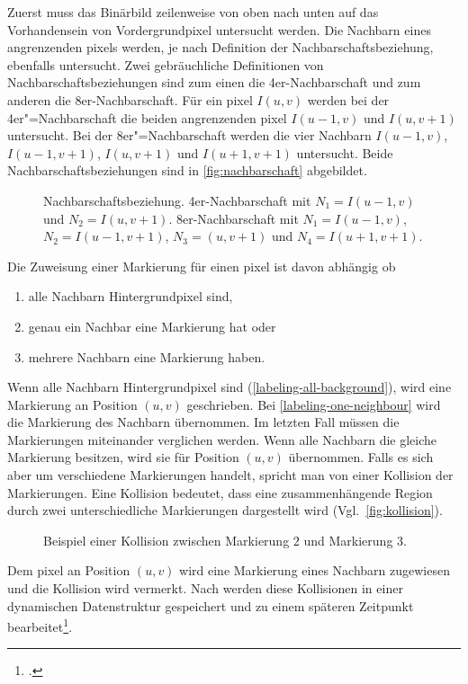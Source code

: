 Zuerst muss das Binärbild zeilenweise von oben nach unten auf das Vorhandensein von Vordergrundpixel untersucht werden.
Die Nachbarn eines angrenzenden \glspl{pixel} werden, je nach Definition der Nachbarschaftsbeziehung, ebenfalls
 untersucht. Zwei gebräuchliche Definitionen von Nachbarschaftsbeziehungen sind zum einen die 4er-Nachbarschaft und zum
 anderen die 8er-Nachbarschaft. Für ein \gls{pixel} $I(u,v)$ werden bei der 4er"=Nachbarschaft die beiden angrenzenden
 \gls{pixel} $I(u-1,v)$ und $I(u,v+1)$ untersucht. Bei der 8er"=Nachbarschaft werden die vier Nachbarn $I(u-1,v)$,
 $I(u-1,v+1)$, $I(u,v+1)$ und $I(u+1,v+1)$ untersucht. Beide Nachbarschaftsbeziehungen sind in
 \autoref{fig:nachbarschaft} abgebildet.
\begin{figure}[!ht]
	\centering
	\subfigure[]{
		\label{fig:4er-nachbarschaft}
		
	}
	\subfigure[]{
		\label{fig:8er-nachbarschaft}
		
	}
	\caption{Nachbarschaftsbeziehung.  4er-Nachbarschaft mit $N_1 = I(u-1,v)$ und
	 $N_2 = I(u,v+1)$.  8er-Nachbarschaft mit $N_1 = I(u-1,v)$, $N_2 = I(u-1,v+1)$,
	 $N_3 = (u,v+1)$ und $N_4 = I(u+1,v+1)$.}
	\label{fig:nachbarschaft}
\end{figure}
Die Zuweisung einer Markierung für einen \gls{pixel} ist davon abhängig ob
\begin{enumerate}
	\item alle Nachbarn Hintergrundpixel sind, \label{labeling-all-background}
	\item genau ein Nachbar eine Markierung hat oder \label{labeling-one-neighbour}
	\item mehrere Nachbarn eine Markierung haben. \label{labeling-many-neighbours}
\end{enumerate}

Wenn alle Nachbarn Hintergrundpixel sind (\autoref{labeling-all-background}), wird eine Markierung an Position $(u,v)$
 geschrieben. Bei \autoref{labeling-one-neighbour} wird die Markierung des Nachbarn übernommen. Im letzten Fall müssen
 die Markierungen miteinander verglichen werden. Wenn alle Nachbarn die gleiche Markierung besitzen, wird sie für
 Position $(u,v)$ übernommen. Falls es sich aber um verschiedene Markierungen handelt, spricht man von einer Kollision
 der Markierungen. Eine Kollision bedeutet, dass eine zusammenhängende Region durch zwei unterschiedliche
 Markierungen dargestellt wird (Vgl.~\autoref{fig:kollision}).
\begin{figure}[!ht]
	\centering
	
	\caption{Beispiel einer Kollision zwischen Markierung $2$ und Markierung $3$.}
	\label{fig:kollision}
\end{figure}
Dem \gls{pixel} an Position $(u,v)$ wird eine Markierung eines Nachbarn zugewiesen und die Kollision wird vermerkt. Nach
 \citeauthor{burger05} werden diese Kollisionen in einer dynamischen Datenstruktur gespeichert und zu einem späteren
 Zeitpunkt bearbeitet\footcite[Vgl.][S.~203--204]{burger05}.

